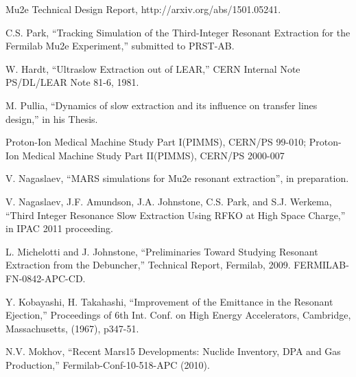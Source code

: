 \documentclass[aps,prstab,onecolumn,preprint]{revtex4-1}
\begin{document}
\begin{thebibliography}{77}
  Mu2e Technical Design Report, http://arxiv.org/abs/1501.05241.

  C.S. Park, ``Tracking Simulation of the Third-Integer Resonant Extraction for the Fermilab Mu2e Experiment,'' submitted to PRST-AB.

  W. Hardt, ``Ultraslow Extraction out of LEAR,'' CERN Internal Note PS/DL/LEAR Note 81-6, 1981.

  M. Pullia, ``Dynamics of slow extraction and its influence on transfer lines design,'' in his Thesis.

  Proton-Ion Medical Machine Study Part I(PIMMS), CERN/PS 99-010; Proton-Ion Medical Machine Study Part II(PIMMS), CERN/PS 2000-007


  V. Nagaslaev, ``MARS simulations for Mu2e resonant extraction'', in preparation.

  V. Nagaslaev, J.F. Amundson, J.A. Johnstone, C.S. Park, and S.J. Werkema,  ``Third Integer Resonance Slow Extraction Using RFKO at High Space Charge,'' in  IPAC 2011 proceeding.

  L. Michelotti and J. Johnstone, ``Preliminaries Toward Studying Resonant Extraction from the Debuncher,'' Technical Report, Fermilab, 2009. FERMILAB-FN-0842-APC-CD.

  Y. Kobayashi, H. Takahashi, ``Improvement of the Emittance in the Resonant Ejection,'' Proceedings of 6th Int. Conf. on High Energy Accelerators, Cambridge, Massachusetts, (1967), p347-51.

  N.V. Mokhov, ``Recent Mars15 Developments: Nuclide Inventory, DPA and Gas Production,'' Fermilab-Conf-10-518-APC (2010).


\end{thebibliography}
\end{document}

